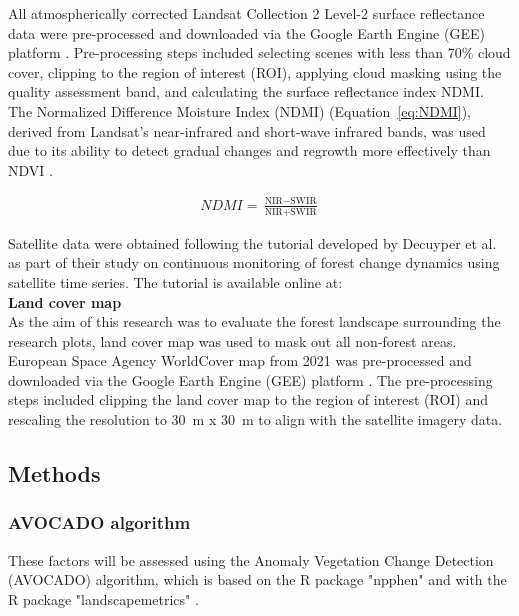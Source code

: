All atmospherically corrected Landsat Collection 2 Level-2 surface reflectance data were pre-processed and downloaded via the Google Earth Engine (GEE) platform \citep{gorelickGoogleEarthEngine2017}. Pre-processing steps included selecting scenes with less than 70\% cloud cover, clipping to the region of interest (ROI), applying cloud masking using the quality assessment band, and calculating the surface reflectance index NDMI. The Normalized Difference Moisture Index (NDMI) (Equation~\ref{eq:NDMI}), derived from Landsat's near-infrared and short-wave infrared bands, was used due to its ability to detect gradual changes and regrowth more effectively than NDVI \citep{vermotePreliminaryAnalysisPerformance2016}.

\begin{align}
\label{eq:NDMI}
NDMI = \frac{\text{NIR} - \text{SWIR}}{\text{NIR} + \text{SWIR}}
\end{align}

Satellite data were obtained following the tutorial developed by Decuyper et al. as part of their study on continuous monitoring of forest change dynamics using satellite time series. The tutorial is available online at:
\href{https://www.pucv.cl/uuaa/labgrs/proyectos/tutorial-to-the-anomaly-vegetation-change-detection-avocado}\\

\textbf{Land cover map}\\

As the aim of this research was to evaluate the forest landscape surrounding the research plots, land cover map was used to mask out all non-forest areas. European Space Agency WorldCover map from 2021 was pre-processed and downloaded via the Google Earth Engine (GEE) platform \citep{gorelickGoogleEarthEngine2017, zanagaESAWorldCover102022}. The pre-processing steps included clipping the land cover map to the region of interest (ROI) and rescaling the resolution to 30~m x 30~m to align with the satellite imagery data. 

\subsection{Methods}

\subsubsection{AVOCADO algorithm}
These factors will be assessed using the Anomaly Vegetation Change Detection (AVOCADO) algorithm, which is based on the R package "npphen" and with the R package "landscapemetrics" \citep{decuyperContinuousMonitoringForest2022, chavez2017npphen, hesselbarth2019landscapemetrics}. 


